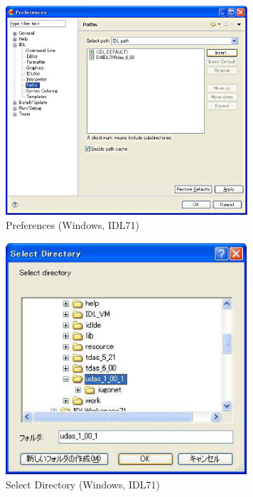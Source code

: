\documentclass[a4j]{jbook}
\begin{document}
\begin{figure}[H]
\begin{center}
\includegraphics[width=9cm]{fig_idl71/Fig3.eps}
\caption{Preferences (Windows, IDL71)}
\label{idl71/Fig3.eps}
\end{center}
\end{figure}

\begin{figure}[H]
\begin{center}
\includegraphics[width=9cm]{fig_idl71/Fig8.eps}
\caption{Select Directory (Windows, IDL71)}
\label{idl71/Fig8.eps}
\end{center}
\end{figure}
\end{document}
